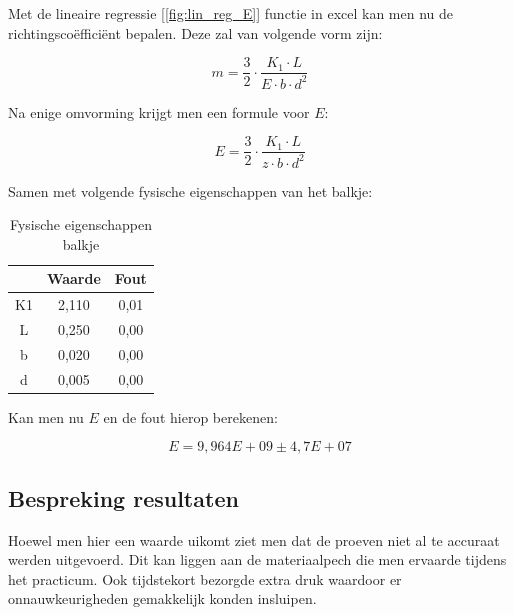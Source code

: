 Met de lineaire regressie [\ref{fig:lin_reg_E}] functie in excel kan men nu de
richtingsco\"effici\"ent bepalen. Deze zal van volgende vorm
zijn:

\begin{equation}
    m = \frac{3}{2} \cdot \frac{K_1 \cdot L}{E \cdot b \cdot d^2}
\end{equation}

Na enige omvorming krijgt men een formule voor $E$:

\begin{equation}
    E = \frac{3}{2} \cdot \frac{K_1 \cdot L}{z \cdot b \cdot d^2}
\end{equation}

Samen met volgende fysische eigenschappen van het balkje:

\begin{table}[h]
    \centering
    \caption{Fysische eigenschappen balkje}
    \label{tab:fys_eig_balkje}
    \begin{tabular}{| c | c | c |}
        \hline
            & Waarde& Fout \\ \hline
        K1  & 2,110 & 0,01 \\ \hline
        L   & 0,250 & 0,00 \\ \hline
        b   & 0,020 & 0,00 \\ \hline
        d   & 0,005 & 0,00 \\ \hline
    \end{tabular}
\end{table}

Kan men nu $E$ en de fout hierop berekenen:

\begin{equation}
    E = 9,964E+09 \pm 4,7E+07
\end{equation}

\subsection{Bespreking resultaten}

Hoewel men hier een waarde uikomt ziet men dat de proeven
niet al te accuraat werden uitgevoerd. Dit kan liggen aan
de materiaalpech die men ervaarde tijdens het practicum. Ook
tijdstekort bezorgde extra druk waardoor er
onnauwkeurigheden gemakkelijk konden insluipen.

